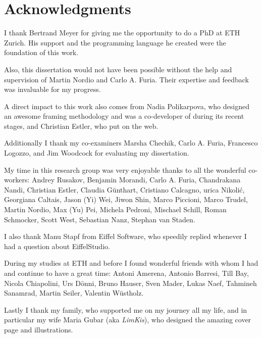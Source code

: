\chapter*{Acknowledgments}



I thank Bertrand Meyer for giving me the opportunity to do a PhD at ETH Zurich.
His support and the programming language he created were the foundation of this work.


Also, this dissertation would not have been possible without the help and supervision of Martin Nordio and Carlo A. Furia.
Their expertise and feedback was invaluable for my progress.


A direct impact to this work also comes from Nadia Polikarpova, who designed an awesome framing methodology and was a co-developer of \AutoProof during its recent stages, and Christian Estler, who put \AutoProof on the web.


Additionally I thank my co-examiners Marsha Chechik, Carlo A. Furia, Francesco Logozzo, and Jim Woodcock for evaluating my dissertation.


My time in this research group was very enjoyable thanks to all the wonderful co-workers:
 Andrey Rusakov,
 Benjamin Morandi,
 Carlo A. Furia,
 Chandrakana Nandi,
 Christian Estler,
 Claudia G\"unthart,
 Cristiano Cal\-ca\-gno,
 \DH urica Nikoli\'{c},
 Georgiana Caltais,
 Jason (Yi) Wei,
 Jiwon Shin,
 Marco Piccioni,
 Marco Trudel,
 Martin Nordio,
 Max (Yu) Pei,
 Michela Pedroni,
 Mischael Schill,
 Roman Schmocker,
 Scott West,
 Sebastian Nanz,
 Stephan van Staden.


I also thank Manu Stapf from Eiffel Software, who speedily replied whenever I had a question about EiffelStudio.


During my studies at ETH and before I found wonderful friends with whom I had and continue to have a great time: 
 Antoni Amerena,
 Antonio Barresi,
 Till Bay,
 Nicola Chiapolini,
 Urs D\"onni,
 Bruno Hauser,
 Sven Mader,
 Lukas Naef,
 Tahmineh Sanamrad,
 Martin Seiler,
 Valentin W\"ustholz.

Lastly I thank my family, who supported me on my journey all my life, and in particular my wife Maria Gubar (aka \emph{LimKis}), who designed the amazing cover page and illustrations.


